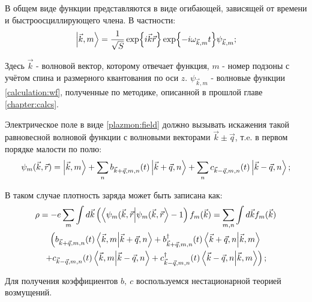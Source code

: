 \documentclass[../main.tex]{subfiles}
\begin{document}
    В общем виде функции представляются в виде огибающей, зависящей 
    от времени и быстроосциллирующего члена. В частности:
    \begin{equation}
        \label{plasmons:wf0}
        \ket{\vec k, m} = \frac{1}{\sqrt S} \exp{i\vec k \vec r}
            \exp{-i \omega_{\vec k, m} t} \psi_{\vec k, m};
    \end{equation}

    Здесь $\vec k$ - волновой вектор, которому отвечает функция, 
    $m$ - номер подзоны с учётом спина и размерного квантования 
    по оси $z$. $\psi_{\vec k, m}$ - волновые функции
    \ref{calculation:wf}, полученные по методике, 
    описанной в прошлой главе \ref{chapter:calcs}. 

    Электрическое поле в виде \ref{plazmon:field} должно вызывать 
    искажения 
    такой равновесной волновой функции с волновыми векторами
    $\vec k \pm \vec q$, т.e. в первом порядке малости по полю:
    \begin{equation}
        \label{plasmons:wf1}
        \psi_m (\vec k, \vec r) = \ket{\vec k, m} + \sum_n b_{\vec k 
            + \vec q, m, n} (t) \ket{\vec k + \vec q, n} + \sum_n 
            c_{\vec k - \vec q, m, n} (t) \ket{\vec k - \vec q, n};
    \end{equation}

    В таком случае плотность заряда может быть записана как:
    \begin{multline}
        \label{charge_density}
        \rho = -e \sum_{m} \int d\vec k  \left(
            \bra{\psi_m (\vec k, \vec r}\ket{\psi_m (\vec k, 
            \vec r} - 1\right) f_m(\vec k) =
            \sum_{m, n} \int d \vec k f_m (\vec k) \\
            \left( b_{\vec k + \vec q, m, n} (t)
            \bra{\vec k, m} \ket{\vec k 
            + \vec q, n} + b^\dagger_{\vec k + \vec q, m, n} (t) 
            \bra{\vec k + \vec q, n} \ket{\vec k, m}\right.\\ 
            \left. + c_{\vec k - \vec q, m, n} (t) \bra{\vec k, m} 
            \ket{\vec k  - \vec q, n} + c^\dagger_{\vec k - \vec q, m, n} 
            (t) \bra{\vec k - \vec q, n} \ket{\vec k, m} \right);
    \end{multline}
    
    Для получения коэффициентов $b,~c$ воспользуемся нестационарной 
    теорией возмущений.
\end{document}
